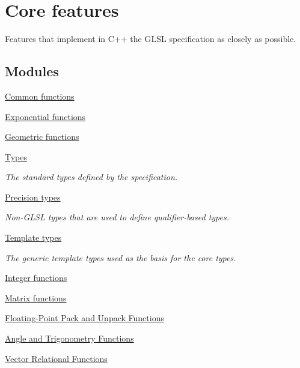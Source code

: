 \hypertarget{group__core}{}\section{Core features}
\label{group__core}


Features that implement in C++ the G\+L\+SL specification as closely as possible.  


\subsection*{Modules}
\begin{DoxyCompactItemize}
\item 
\hyperlink{group__core__func__common}{Common functions}
\item 
\hyperlink{group__core__func__exponential}{Exponential functions}
\item 
\hyperlink{group__core__func__geometric}{Geometric functions}
\item 
\hyperlink{group__core__types}{Types}
\begin{DoxyCompactList}\small\item\em The standard types defined by the specification. \end{DoxyCompactList}\item 
\hyperlink{group__core__precision}{Precision types}
\begin{DoxyCompactList}\small\item\em Non-\/\+G\+L\+SL types that are used to define qualifier-\/based types. \end{DoxyCompactList}\item 
\hyperlink{group__core__template}{Template types}
\begin{DoxyCompactList}\small\item\em The generic template types used as the basis for the core types. \end{DoxyCompactList}\item 
\hyperlink{group__core__func__integer}{Integer functions}
\item 
\hyperlink{group__core__func__matrix}{Matrix functions}
\item 
\hyperlink{group__core__func__packing}{Floating-\/\+Point Pack and Unpack Functions}
\item 
\hyperlink{group__core__func__trigonometric}{Angle and Trigonometry Functions}
\item 
\hyperlink{group__core__func__vector__relational}{Vector Relational Functions}
\end{DoxyCompactItemize}



